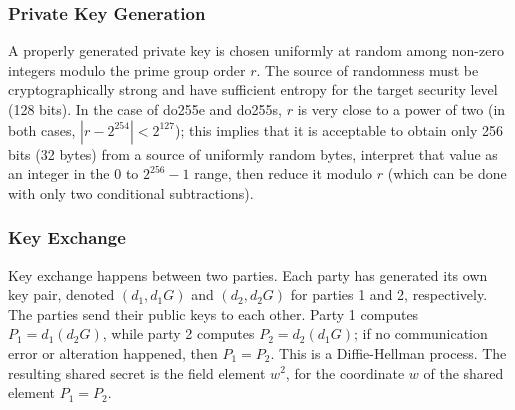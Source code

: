 \documentclass{llncs}
\begin{document}
\subsubsection{Private Key Generation}

A properly generated private key is chosen uniformly at random among
non-zero integers modulo the prime group order $r$. The source of
randomness must be cryptographically strong and have sufficient entropy
for the target security level (128 bits). In the case of do255e and
do255s, $r$ is very close to a power of two (in both cases, $|r -
2^{254}| < 2^{127}$); this implies that it is acceptable to obtain only
256 bits (32 bytes) from a source of uniformly random bytes, interpret
that value as an integer in the $0$ to $2^{256}-1$ range, then reduce it
modulo $r$ (which can be done with only two conditional subtractions).

\subsubsection{Key Exchange}

Key exchange happens between two parties. Each party has generated its
own key pair, denoted $(d_1, d_1 G)$ and $(d_2, d_2 G)$ for parties 1 and 2,
respectively. The parties send their public keys to each other. Party 1
computes $P_1 = d_1 (d_2 G)$, while party 2 computes $P_2 = d_2 (d_1
G)$; if no communication error or alteration happened, then $P_1 = P_2$.
This is a Diffie-Hellman process\cite{DifHel1976}. The resulting shared
secret is the field element $w^2$, for the coordinate $w$ of the shared
element $P_1 = P_2$.
\end{document}
